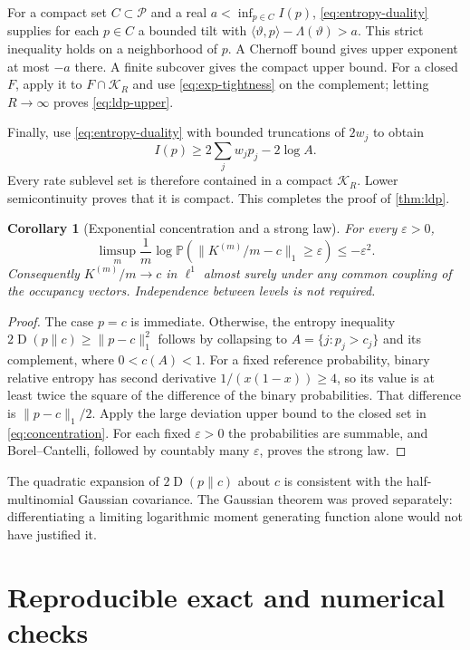 \documentclass[11pt,a4paper]{article}
\numberwithin{equation}{section}
\newtheorem{corollary}[theorem]{Corollary}
\theoremstyle{definition}
\theoremstyle{remark}
\newcommand{\PP}{\mathbb P}
\newcommand{\KL}{\operatorname{D}}
\newcommand{\simplex}{\mathcal P}
\begin{document}
For a compact set $C\subset\simplex$ and a real
$a<\inf_{p\in C}I(p)$, \cref{eq:entropy-duality} supplies for each
$p\in C$ a bounded tilt with
$\langle\vartheta,p\rangle-\Lambda(\vartheta)>a$.
This strict inequality holds on a neighborhood of $p$. A Chernoff bound
gives upper exponent at most $-a$ there. A finite subcover gives the
compact upper bound. For a closed $F$, apply it to $F\cap\mathcal K_R$
and use \cref{eq:exp-tightness} on the complement; letting $R\to\infty$
proves \cref{eq:ldp-upper}.

Finally, use \cref{eq:entropy-duality} with bounded truncations of
$2w_j$ to obtain
\[
I(p)\ge2\sum_jw_jp_j-2\log A.
\]
Every rate sublevel set is therefore contained in a compact $\mathcal K_R$.
Lower semicontinuity proves that it is compact. This completes the proof
of \cref{thm:ldp}.

\begin{corollary}[Exponential concentration and a strong law]
\label{cor:concentration}
For every $\varepsilon>0$,
\begin{equation}
\limsup_m\frac1m\log\PP(\|K^{(m)}/m-c\|_1\ge\varepsilon)
\le-\varepsilon^2.
\label{eq:concentration}
\end{equation}
Consequently $K^{(m)}/m\to c$ in $\ell^1$ almost surely under any
common coupling of the occupancy vectors. Independence between levels
is not required.
\end{corollary}
\begin{proof}
The case $p=c$ is immediate. Otherwise, the entropy inequality
$2\KL(p\|c)\ge\|p-c\|_1^2$ follows by collapsing to
$A=\{j:p_j>c_j\}$ and its complement, where $0<c(A)<1$. For a fixed reference probability, binary relative entropy has second
derivative $1/(x(1-x))\ge4$, so its value is at least twice the square
of the difference of the binary probabilities. That difference is
$\|p-c\|_1/2$. Apply the large deviation upper bound to the closed set
in \cref{eq:concentration}. For each fixed $\varepsilon>0$ the
probabilities are summable, and Borel--Cantelli, followed by countably
many $\varepsilon$, proves the strong law.
\end{proof}

The quadratic expansion of $2\KL(p\|c)$ about $c$ is consistent with
the half-multinomial Gaussian covariance. The Gaussian theorem was proved
separately: differentiating a limiting logarithmic moment generating
function alone would not have justified it.

\section{Reproducible exact and numerical checks}
\label{sec:numerics}
\end{document}
